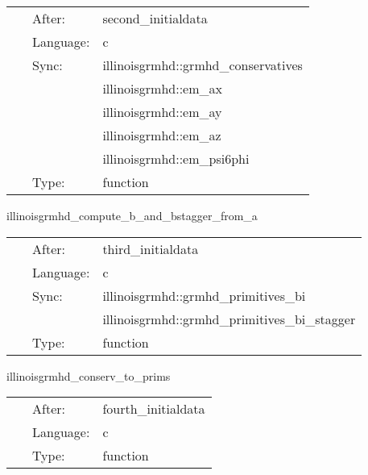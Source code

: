 \hspace{5mm}

 \begin{tabular*}{160mm}{cll} 
~ & After:  & second\_initialdata \\ 
~ & Language:  & c \\ 
~ & Sync:  & illinoisgrmhd::grmhd\_conservatives \\ 
~& ~ &illinoisgrmhd::em\_ax\\ 
~& ~ &illinoisgrmhd::em\_ay\\ 
~& ~ &illinoisgrmhd::em\_az\\ 
~& ~ &illinoisgrmhd::em\_psi6phi\\ 
~ & Type:  & function \\ 
\end{tabular*} 


\vspace{5mm}


\hspace{5mm} illinoisgrmhd\_compute\_b\_and\_bstagger\_from\_a 

\hspace{5mm}{\it compute b and b\_stagger from a } 


\hspace{5mm}

 \begin{tabular*}{160mm}{cll} 
~ & After:  & third\_initialdata \\ 
~ & Language:  & c \\ 
~ & Sync:  & illinoisgrmhd::grmhd\_primitives\_bi \\ 
~& ~ &illinoisgrmhd::grmhd\_primitives\_bi\_stagger\\ 
~ & Type:  & function \\ 
\end{tabular*} 


\vspace{5mm}


\hspace{5mm} illinoisgrmhd\_conserv\_to\_prims 

\hspace{5mm}{\it compute primitive variables from conservatives. this is non-trivial, requiring a newton-raphson root-finder. } 


\hspace{5mm}

 \begin{tabular*}{160mm}{cll} 
~ & After:  & fourth\_initialdata \\ 
~ & Language:  & c \\ 
~ & Type:  & function \\ 
\end{tabular*} 


